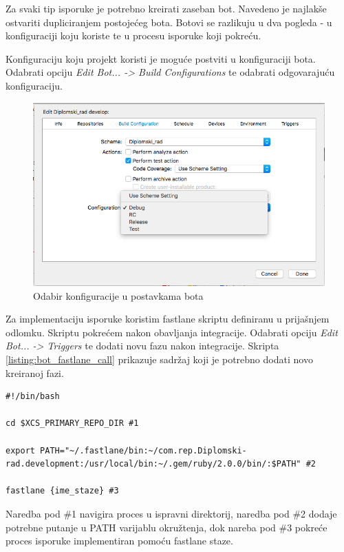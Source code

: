 \documentclass[times, utf8, diplomski, numeric]{fer}
\begin{document}
\begin{appendices}
Za svaki tip isporuke je potrebno kreirati zaseban bot. Navedeno je najlakše ostvariti dupliciranjem postojećeg bota. Botovi se razlikuju u dva pogleda - u konfiguraciji koju koriste te u procesu isporuke koji pokreću.

Konfiguraciju koju projekt koristi je moguće postviti u konfiguraciji bota. Odabrati opciju \textit{Edit Bot... -> Build Configurations} te odabrati odgovarajuću konfiguraciju.

\begin{figure}
\centering
\includegraphics[scale=0.5]{BotConfiguration}
\caption{Odabir konfiguracije u postavkama bota}
\label{fig:BotConfiguration}
\end{figure}

Za implementaciju isporuke koristim fastlane skriptu definiranu u prijašnjem odlomku. Skriptu pokrećem nakon obavljanja integracije. Odabrati opciju \textit{Edit Bot... -> Triggers} te dodati novu fazu nakon integracije. Skripta \ref{listing:bot_fastlane_call} prikazuje sadržaj koji je potrebno dodati novo kreiranoj fazi.

\begin{lstlisting}[caption=Sadržaj faze nakon obavljanja isporuke, label=listing:bot_fastlane_call]
#!/bin/bash

cd $XCS_PRIMARY_REPO_DIR #1

export PATH="~/.fastlane/bin:~/com.rep.Diplomski-rad.development:/usr/local/bin:~/.gem/ruby/2.0.0/bin/:$PATH" #2

fastlane {ime_staze} #3
\end{lstlisting}

Naredba pod \#1 navigira proces u ispravni direktorij, naredba pod \#2 dodaje potrebne putanje u PATH varijablu okružtenja, dok nareba pod \#3 pokreće proces isporuke implementiran pomoću fastlane staze.


\end{appendices}
\end{document}
